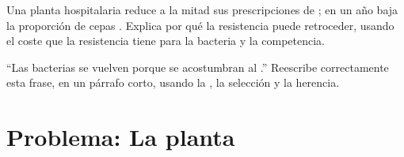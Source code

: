 \begin{exercise}[$\star\star\star$]\label{exo:g11:antibiotic-resistance:14}
Una planta hospitalaria reduce a la mitad sus prescripciones de
; en un año baja la proporción de cepas .
Explica por qué la resistencia puede retroceder, usando el coste que la
resistencia tiene para la bacteria y la competencia.
\end{exercise}

\begin{exercise}[$\star\star\star$]\label{exo:g11:antibiotic-resistance:15}
``Las bacterias se vuelven  porque se acostumbran al
.'' Reescribe correctamente esta frase, en un párrafo corto,
usando la , la selección y la herencia.
\end{exercise}

\section{Problema: La planta}

